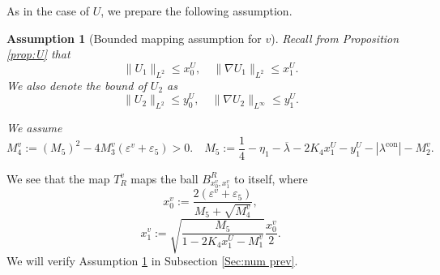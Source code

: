 \documentclass[11pt,a4paper]{article}
\numberwithin{equation}{section}
\newcommand{\assign}{:=}
\newcommand{\tmop}[1]{\ensuremath{\operatorname{#1}}}
\newtheorem{assumption}{Assumption}
\begin{document}
As in the case of $U$, we prepare the following assumption.
\begin{assumption}[Bounded mapping assumption for $v$]\label{asm:cond ref v} Recall from Proposition \ref{prop:U} that \[\| 
  U_1 \|_{L^2}\leqslant x_0^U,\quad\| \nabla
  U_1 \|_{L^2}\leqslant x_1^U.\]
We also denote the bound of $U_2$ as
\[\| 
  U_2 \|_{L^2}\leqslant y_0^U,\quad\| \nabla
  U_2 \|_{L^\infty}\leqslant y_1^U.\]
  
We assume\begin{equation*}
    M_4^v\assign (M_5)^2 - 4M_3^v (\varepsilon^v
  + \varepsilon_5) > 0.\quad M_5  \assign  \frac{1}{4} - \eta_1 - \overline{\lambda} - 2 K_4 x_1^U - y_1^U - | \lambda^{\tmop{con}} | - M_2^v . 
  \end{equation*}
\end{assumption}
We see that the map $T_R^v$ maps the ball $B^R_{x_0^v, x_1^v}$ to itself, where
  \[ x_0^v \assign \frac{2(\varepsilon^v+
  \varepsilon_5)}{M_5+ \sqrt{ M_4^v}} ,\]\[ x_1^v \assign \sqrt{\frac{M_5}{1 - 2K_4 x_1^U  -
  M_1^v}} \frac{x_0^v}{2}. \]
We will verify Assumption \ref{asm:cond ref v} in Subsection \ref{Sec:num prev}.

\end{document}
